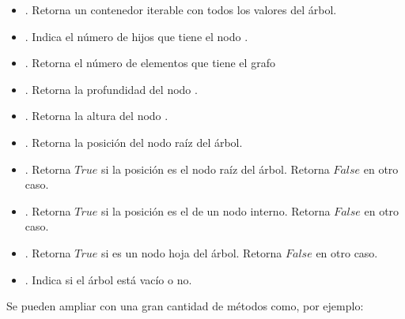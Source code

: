 \begin{definition}{}
\begin{itemize}
\item {}. Retorna un contenedor iterable con todos los valores del árbol.

\item {}. Indica el número de hijos que tiene el nodo .

\item {}. Retorna el número de elementos que tiene el grafo

\item {}. Retorna la profundidad del nodo .

\item {}. Retorna la altura del nodo .

\item {}. Retorna la posición del nodo raíz del árbol. 

\item {}. Retorna $True$ si la posición  es el nodo raíz del árbol. Retorna $False$ en otro caso.

\item {}. Retorna $True$ si la posición  es el de un nodo interno. Retorna $False$ en otro caso.

\item {}. Retorna $True$ si   es un nodo hoja del árbol. Retorna $False$ en otro caso.

\item {}. Indica si el árbol está vacío o no.
\end{itemize}

\end{definition}

Se pueden ampliar con una gran cantidad de métodos como, por ejemplo:

